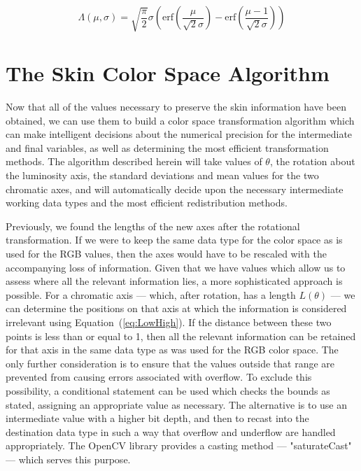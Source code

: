 \begin{equation}\label{Fidelity}
  \Lambda(\mu,\sigma) =  \sqrt{\frac{\pi }{2}} \sigma  \left(\text{erf}\left(\frac{\mu }{\sqrt{2} \sigma }\right)-\text{erf}\left(\frac{\mu -1}{\sqrt{2} \sigma }\right)\right)
\end{equation}

\section{The Skin Color Space Algorithm}

Now that all of the values necessary to preserve the skin information have been obtained, we can use them to build a color space transformation algorithm which can make intelligent decisions about the numerical precision for the intermediate and final variables, as well as determining the most efficient transformation methods. The algorithm described herein will take values of $\theta$, the rotation about the luminosity axis, the standard deviations and mean values for the two chromatic axes, and will automatically decide upon the necessary intermediate working data types and the most efficient redistribution methods.

Previously, we found the lengths of the new axes after the rotational transformation. If we were to keep the same data type for the color space as is used for the RGB values, then the axes would have to be rescaled with the accompanying loss of information. Given that we have values which allow us to assess where all the relevant information lies, a more sophisticated approach is possible. For a chromatic axis --- which, after rotation, has a length $L(\theta)$ --- we can determine the positions on that axis at which the information is considered irrelevant using Equation~(\ref{eq:LowHigh}). If the distance between these two points is less than or equal to 1, then all the relevant information can be retained for that axis in the same data type as was used for the RGB color space. The only further consideration is to ensure that the values outside that range are prevented from causing errors associated with overflow. To exclude this possibility, a conditional statement can be used which checks the bounds as stated, assigning an appropriate value as necessary. The alternative is to use an intermediate value with a higher bit depth, and then to recast into the destination data type in such a way that overflow and underflow are handled appropriately. The OpenCV library provides a casting method --- "saturateCast" --- which serves this purpose.

